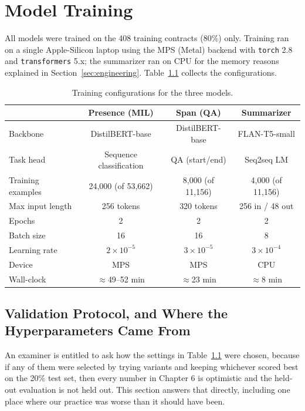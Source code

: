 \chapter{Model Training}

All models were trained on the 408 training contracts (80\%) only. Training ran on a single Apple-Silicon laptop using the MPS (Metal) backend with \texttt{torch} 2.8 and \texttt{transformers} 5.x; the summarizer ran on CPU for the memory reasons explained in Section~\ref{sec:engineering}. Table~\ref{tab:hyper} collects the configurations.

\begin{table}[ht]
\centering
\caption{Training configurations for the three models.}
\label{tab:hyper}
\small
\begin{tabular}{lccc}
\toprule
 & \textbf{Presence (MIL)} & \textbf{Span (QA)} & \textbf{Summarizer}\\
\midrule
Backbone            & DistilBERT-base & DistilBERT-base & FLAN-T5-small\\
Task head           & Sequence classification & QA (start/end) & Seq2seq LM\\
Training examples   & 24{,}000 (of 53{,}662) & 8{,}000 (of 11{,}156) & 4{,}000 (of 11{,}156)\\
Max input length    & 256 tokens & 320 tokens & 256 in / 48 out\\
Epochs              & 2 & 2 & 2\\
Batch size          & 16 & 16 & 8\\
Learning rate       & $2\times10^{-5}$ & $3\times10^{-5}$ & $3\times10^{-4}$\\
Device              & MPS & MPS & CPU\\
Wall-clock          & $\approx$49--52 min & $\approx$23 min & $\approx$8 min\\
\bottomrule
\end{tabular}
\end{table}

\section{Validation Protocol, and Where the Hyperparameters Came From}
\label{sec:valprotocol}
An examiner is entitled to ask how the settings in Table~\ref{tab:hyper} were chosen, because if any of them were selected by trying variants and keeping whichever scored best on the 20\% test set, then every number in Chapter 6 is optimistic and the held-out evaluation is not held out. This section answers that directly, including one place where our practice was worse than it should have been.

